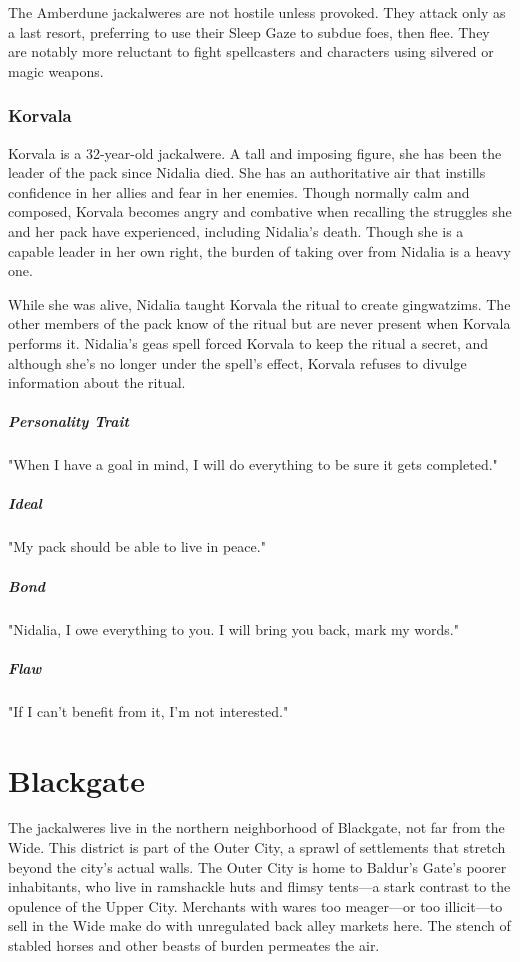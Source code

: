 \documentclass[10pt,a4paper,twoside,bg=print,twocolumn,openany,nodeprecatedcode]{dndbook}
\begin{document}
The Amberdune jackalweres are not hostile unless provoked. They attack only as a last resort, preferring to use their Sleep Gaze to subdue foes, then flee. They are notably more reluctant to fight spellcasters and characters using silvered or magic weapons.

\subsubsection{Korvala}
Korvala is a 32-year-old jackalwere. A tall and imposing figure, she has been the leader of the pack since Nidalia died. She has an authoritative air that instills confidence in her allies and fear in her enemies. Though normally calm and composed, Korvala becomes angry and combative when recalling the struggles she and her pack have experienced, including Nidalia's death. Though she is a capable leader in her own right, the burden of taking over from Nidalia is a heavy one.

While she was alive, Nidalia taught Korvala the ritual to create gingwatzims. The other members of the pack know of the ritual but are never present when Korvala performs it. Nidalia's geas spell forced Korvala to keep the ritual a secret, and although she's no longer under the spell's effect, Korvala refuses to divulge information about the ritual.

\subparagraph{Personality Trait}
"When I have a goal in mind, I will do everything to be sure it gets completed."

\subparagraph{Ideal}
"My pack should be able to live in peace."

\subparagraph{Bond}
"Nidalia, I owe everything to you. I will bring you back, mark my words."

\subparagraph{Flaw}
"If I can't benefit from it, I'm not interested."

\section{Blackgate}
The jackalweres live in the northern neighborhood of Blackgate, not far from the Wide. This district is part of the Outer City, a sprawl of settlements that stretch beyond the city's actual walls. The Outer City is home to Baldur's Gate's poorer inhabitants, who live in ramshackle huts and flimsy tents—a stark contrast to the opulence of the Upper City. Merchants with wares too meager—or too illicit—to sell in the Wide make do with unregulated back alley markets here. The stench of stabled horses and other beasts of burden permeates the air.
\end{document}
